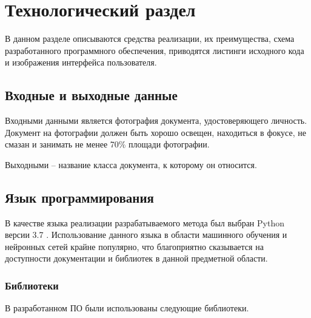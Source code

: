 \chapter{\textbf{Технологический раздел}}

В данном разделе описываются средства реализации, их преимущества, схема разработанного программного обеспечения, приводятся листинги исходного кода и изображения интерфейса пользователя.

\section{Входные и выходные данные}

Входными данными является фотография документа, удостоверяющего личность. Документ на фотографии должен быть хорошо освещен, находиться в фокусе, не смазан и занимать не менее 70\% площади фотографии.

Выходными -- название класса документа, к которому он относится.

\section{Язык программирования}

В качестве языка реализации разрабатываемого метода был выбран Python версии 3.7 \cite{python}. Использование данного языка в области машинного обучения и нейронных сетей крайне популярно, что благоприятно сказывается на доступности документации и библиотек в данной предметной области.

\subsection{Библиотеки}

В разработанном ПО были использованы следующие библиотеки.

